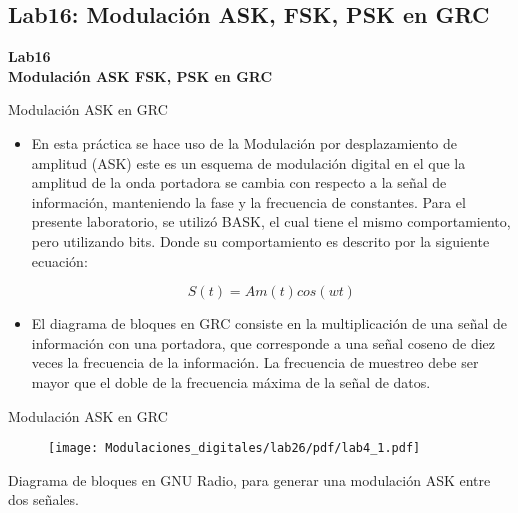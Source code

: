 \subsection{Lab16: Modulación ASK, FSK, PSK en GRC}

\begin{frame}{}


\bfseries{\textrm{\LARGE Lab16\\ \Large Modulación ASK FSK, PSK en GRC}}
\raggedright
\end{frame}


\begin{frame}{Modulación ASK en GRC}

  \begin{itemize}
  \item {
En esta práctica se hace uso de la  Modulación por desplazamiento de amplitud (ASK) este es un esquema de modulación digital en el que la amplitud de la onda portadora se cambia con respecto a la señal de información, manteniendo la fase y la frecuencia de constantes. Para el presente laboratorio, se utilizó BASK, el cual tiene el mismo comportamiento, pero utilizando bits. Donde su comportamiento es descrito por la siguiente ecuación:

\begin{equation*}
S(t) = Am(t)cos(wt)
\end{equation*}

  }
\item {
El diagrama de bloques en GRC consiste en la multiplicación de una señal de información con una portadora, que corresponde a una señal coseno de diez veces la frecuencia de la información. La frecuencia de muestreo debe ser mayor que el doble de la frecuencia máxima de la señal de datos.
  }
  \end{itemize}
\end{frame}

\begin{frame}{Modulación ASK en GRC}
\begin{figure}[H]
\centering
\texttt{[image: Modulaciones\_digitales/lab26/pdf/lab4\_1.pdf]}
\end{figure}
Diagrama de bloques en GNU Radio, para generar una modulación ASK entre dos señales.
\end{frame}


